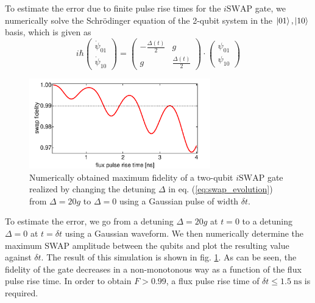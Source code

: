 \smallskip

To estimate the error due to finite pulse rise times for the $i\mathrm{SWAP}$ gate, we numerically solve the Schrödinger equation of the 2-qubit system in the $\left| 01 \right>,\left| 10 \right>$ basis, which is given as
%
\begin{equation}
i\hbar\left(\begin{array}{c} \dot{\psi}_{01} \\ \dot{\psi}_{10} \end{array}\right) = \left( \begin{array}{cc} -\frac{\Delta(t)}{2} & g \\ g & \frac{\Delta(t)}{2}  \end{array} \right)\cdot \left(\begin{array}{c} \psi_{01} \\ \psi_{10} \end{array}\right) \label{eq:swap_evolution}
\end{equation}
%

\begin{figure}
	\centering
	\includegraphics[width=0.7\textwidth]{./material/mathematica/qubit_qubit_swap_error}
	\caption[]{Numerically obtained maximum fidelity of a two-qubit $i\mathrm{SWAP}$ gate realized by changing the detuning $\Delta$ in eq. (\ref{eq:swap_evolution}) from $\Delta = 20g$ to $\Delta=0$ using a Gaussian pulse of width $\delta t$.}
	\label{fig:qubit_qubit_coupling_swap_error}
\end{figure}

To estimate the error, we go from a detuning $\Delta = 20 g$ at $t=0$ to a detuning $\Delta=0$ at $t=\delta t$ using a Gaussian waveform. We then numerically determine the maximum SWAP amplitude between the qubits and plot the resulting value against $\delta t$. The result of this simulation is shown in fig. \ref{fig:qubit_qubit_coupling_swap_error}. As can be seen, the fidelity of the gate decreases in a non-monotonous way as a function of the flux pulse rise time. In order to obtain $F>0.99$, a flux pulse rise time of $\delta t \le 1.5\;\mathrm{ns}$ is required.

